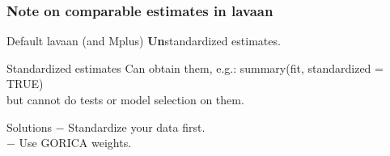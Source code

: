 \documentclass[10pt]{beamer}\usepackage[]{graphicx}\usepackage[]{xcolor}
\begin{document}
%
\begin{frame}
	\frametitle{Note on comparable estimates in lavaan}
	
	\begin{block}{Default lavaan (and Mplus)}
    \textbf{Un}standardized estimates.
	\end{block}
	
	\begin{block}{Standardized estimates}
    Can obtain them, e.g.: summary(fit, standardized = TRUE)\\
    but cannot do tests or model selection on them.
	\end{block}
	
	\begin{block}{Solutions}
    $-$ Standardize your data first.\\
    $-$ Use GORICA weights.
	\end{block}

	
\end{frame}
%
\end{document}
